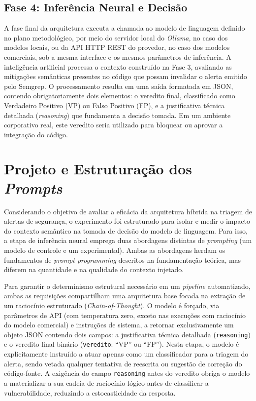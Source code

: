 \subsection{Fase 4: Inferência Neural e Decisão}
A fase final da arquitetura executa a chamada ao modelo de linguagem definido no plano metodológico, por meio do servidor local do \textit{Ollama}, no caso dos modelos locais, ou da API HTTP REST do provedor, no caso dos modelos comerciais, sob a mesma interface e os mesmos parâmetros de inferência. A inteligência artificial processa o contexto construído na Fase 3, avaliando as mitigações semânticas presentes no código que possam invalidar o alerta emitido pelo Semgrep. O processamento resulta em uma saída formatada em JSON, contendo obrigatoriamente dois elementos: o veredito final, classificado como Verdadeiro Positivo (VP) ou Falso Positivo (FP), e a justificativa técnica detalhada (\textit{reasoning}) que fundamenta a decisão tomada. Em um ambiente corporativo real, este veredito seria utilizado para bloquear ou aprovar a integração do código.

\section{Projeto e Estruturação dos \textit{Prompts}}
\label{sec:prompts}
Considerando o objetivo de avaliar a eficácia da arquitetura híbrida na triagem de alertas de segurança, o experimento foi estruturado para isolar e medir o impacto do contexto semântico na tomada de decisão do modelo de linguagem. Para isso, a etapa de inferência neural emprega duas abordagens distintas de \textit{prompting} (um modelo de controle e um experimental). Ambas as abordagens herdam os fundamentos de \textit{prompt programming} descritos na fundamentação teórica, mas diferem na quantidade e na qualidade do contexto injetado.

Para garantir o determinismo estrutural necessário em um \textit{pipeline} automatizado, ambas as requisições compartilham uma arquitetura base focada na extração de um raciocínio estruturado (\textit{Chain-of-Thought}). O modelo é forçado, via parâmetros de API (com temperatura zero, exceto nas execuções com raciocínio do modelo comercial) e instruções de sistema, a retornar exclusivamente um objeto JSON contendo dois campos: a justificativa técnica detalhada (\texttt{reasoning}) e o veredito final binário (\texttt{veredito}: ``VP'' ou ``FP''). Nesta etapa, o modelo é explicitamente instruído a atuar apenas como um classificador para a triagem do alerta, sendo vetada qualquer tentativa de reescrita ou sugestão de correção do código-fonte. A exigência do campo \texttt{reasoning} antes do veredito obriga o modelo a materializar a sua cadeia de raciocínio lógico antes de classificar a vulnerabilidade, reduzindo a estocasticidade da resposta.

